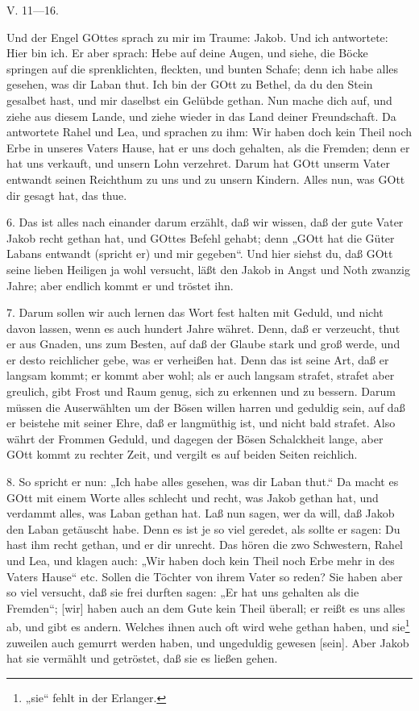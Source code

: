 \begin{schriftzitat}
V. 11—16.

Und der Engel GOttes sprach zu mir im Traume: Jakob. Und ich antwortete: Hier bin ich. Er aber sprach: Hebe auf deine Augen, und siehe, die Böcke springen auf die sprenklichten, fleckten, und bunten Schafe; denn ich habe alles gesehen, was dir Laban thut. Ich bin der GOtt zu Bethel, da du den Stein gesalbet hast, und mir daselbst ein Gelübde gethan. Nun mache dich auf, und ziehe aus diesem Lande, und ziehe wieder in das Land deiner Freundschaft. Da antwortete Rahel und Lea, und sprachen zu ihm: Wir haben doch kein Theil noch Erbe in unseres Vaters Hause, hat er uns doch gehalten, als die Fremden; denn er hat uns verkauft, und unsern Lohn verzehret. Darum hat GOtt unserm Vater entwandt seinen Reichthum zu uns und zu unsern Kindern. Alles nun, was GOtt dir gesagt hat, das thue.
\end{schriftzitat}

6. Das ist alles nach einander darum erzählt, daß wir wissen, daß der gute Vater Jakob recht gethan hat, und GOttes Befehl gehabt; denn „GOtt hat die Güter Labans entwandt (spricht er) und mir gegeben“. Und hier siehst du, daß GOtt seine lieben Heiligen ja wohl versucht, läßt den Jakob in Angst und Noth zwanzig Jahre; aber endlich kommt er und tröstet ihn.

7. Darum sollen wir auch lernen das Wort fest halten mit Geduld, und nicht davon lassen, wenn es auch hundert Jahre währet. Denn, daß er verzeucht, thut er aus Gnaden, uns zum Besten, auf daß der Glaube stark und groß werde, und er desto reichlicher gebe, was er verheißen hat. Denn das ist seine Art, daß er langsam kommt; er kommt aber wohl; als er auch langsam strafet, strafet aber greulich, gibt Frost und Raum genug, sich zu erkennen und zu bessern. Darum müssen die Auserwählten um der Bösen willen harren und geduldig sein, auf daß er beistehe mit seiner Ehre, daß er langmüthig ist, und nicht bald strafet. Also währt der Frommen Geduld, und dagegen der Bösen Schalckheit lange, aber GOtt kommt zu rechter Zeit, und vergilt es auf beiden Seiten reichlich.

8. So spricht er nun: „Ich habe alles gesehen, was dir Laban thut.“ Da macht es GOtt mit einem Worte alles schlecht und recht, was Jakob gethan hat, und verdammt alles, was Laban gethan hat. Laß nun sagen, wer da will, daß Jakob den Laban getäuscht habe. Denn es ist je so viel geredet, als sollte er sagen: Du hast ihm recht gethan, und er dir unrecht. Das hören die zwo Schwestern, Rahel und Lea, und klagen auch: „Wir haben doch kein Theil noch Erbe mehr in des Vaters Hause“ etc. Sollen die Töchter von ihrem Vater so reden? Sie haben aber so viel versucht, daß sie frei durften sagen: „Er hat uns gehalten als die Fremden“; [wir] haben auch an dem Gute kein Theil überall; er reißt es uns alles ab, und gibt es andern. Welches ihnen auch oft wird wehe gethan haben, und sie\footnote{„sie“ fehlt in der Erlanger.} zuweilen auch gemurrt werden haben, und ungeduldig gewesen [sein]. Aber Jakob hat sie vermählt und getröstet, daß sie es ließen gehen.

